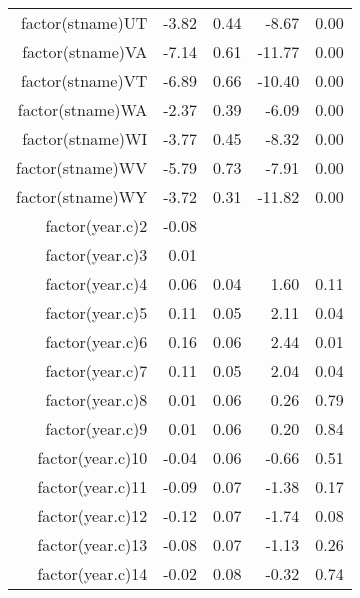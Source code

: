 \begin{table}[ht]
\begin{tabular}{rrrrr}
  factor(stname)UT & -3.82 & 0.44 & -8.67 & 0.00 \\ 
  factor(stname)VA & -7.14 & 0.61 & -11.77 & 0.00 \\ 
  factor(stname)VT & -6.89 & 0.66 & -10.40 & 0.00 \\ 
  factor(stname)WA & -2.37 & 0.39 & -6.09 & 0.00 \\ 
  factor(stname)WI & -3.77 & 0.45 & -8.32 & 0.00 \\ 
  factor(stname)WV & -5.79 & 0.73 & -7.91 & 0.00 \\ 
  factor(stname)WY & -3.72 & 0.31 & -11.82 & 0.00 \\ 
  factor(year.c)2 & -0.08 &  &  &  \\ 
  factor(year.c)3 & 0.01 &  &  &  \\ 
  factor(year.c)4 & 0.06 & 0.04 & 1.60 & 0.11 \\ 
  factor(year.c)5 & 0.11 & 0.05 & 2.11 & 0.04 \\ 
  factor(year.c)6 & 0.16 & 0.06 & 2.44 & 0.01 \\ 
  factor(year.c)7 & 0.11 & 0.05 & 2.04 & 0.04 \\ 
  factor(year.c)8 & 0.01 & 0.06 & 0.26 & 0.79 \\ 
  factor(year.c)9 & 0.01 & 0.06 & 0.20 & 0.84 \\ 
  factor(year.c)10 & -0.04 & 0.06 & -0.66 & 0.51 \\ 
  factor(year.c)11 & -0.09 & 0.07 & -1.38 & 0.17 \\ 
  factor(year.c)12 & -0.12 & 0.07 & -1.74 & 0.08 \\ 
  factor(year.c)13 & -0.08 & 0.07 & -1.13 & 0.26 \\ 
  factor(year.c)14 & -0.02 & 0.08 & -0.32 & 0.74 \\ 
   \hline
\end{tabular}
\end{table}
